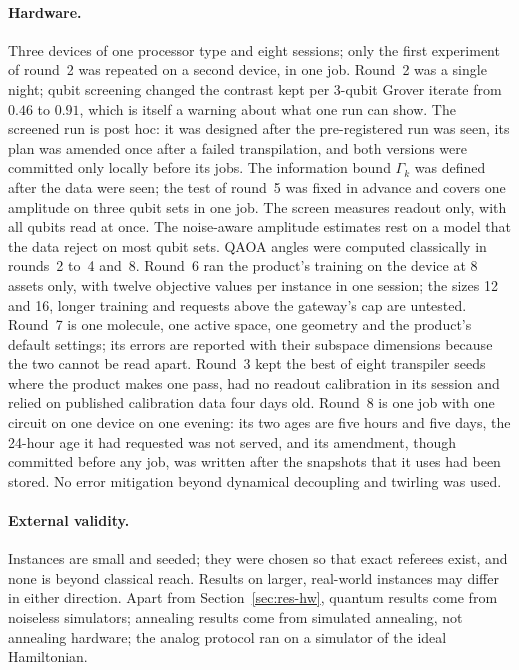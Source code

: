 \documentclass[11pt,a4paper]{article}
\begin{document}
\paragraph{Hardware.} Three devices of one processor type and eight sessions;
only the first experiment of round~2 was repeated on a second device, in
one job. Round~2 was a single
night; qubit screening changed the contrast kept per 3-qubit Grover iterate
from $0.46$ to $0.91$,
which is itself a warning about what one run can show. The screened run is
post hoc: it was designed after the pre-registered run was seen, its plan
was amended once after a failed transpilation, and both versions were
committed only locally before its jobs. The information bound $\Gamma_k$
was defined after the data were seen; the test of round~5 was fixed in
advance and covers one amplitude on three qubit sets in one job. The screen measures readout only,
with all qubits read at once. The noise-aware amplitude estimates rest on a
model that the data reject on most qubit sets. QAOA angles were computed
classically in rounds~2 to~4 and~8. Round~6 ran the product's training on the
device at 8 assets only, with twelve objective values per instance in one
session; the sizes 12 and 16, longer training and requests above the
gateway's cap are untested. Round~7 is one molecule, one active space, one
geometry and the product's default settings; its errors are reported with
their subspace dimensions because the two cannot be read apart. Round~3 kept the best of eight transpiler seeds where the
product makes one pass, had no readout calibration in its session and
relied on published calibration data four days old. Round~8 is one job
with one circuit on one device on one evening: its two ages are five hours
and five days, the 24-hour age it had requested was not served, and its
amendment, though committed before any job, was written after the
snapshots that it uses had been stored. No error mitigation
beyond dynamical decoupling and twirling was used.

\paragraph{External validity.} Instances are small and seeded; they were
chosen so that exact referees exist, and none is beyond classical reach.
Results on larger, real-world instances may differ in either direction.
Apart from Section~\ref{sec:res-hw}, quantum results come from noiseless
simulators; annealing results come from simulated annealing, not annealing
hardware; the analog protocol ran on a simulator of the ideal Hamiltonian.
\end{document}
